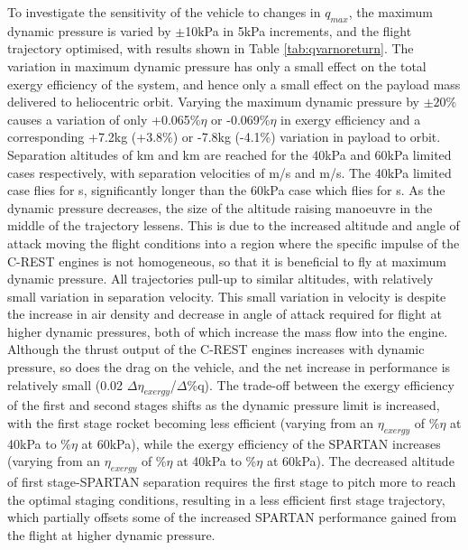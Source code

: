 To investigate the sensitivity of the vehicle to changes in $q_{max}$, the maximum dynamic pressure is varied by $\pm$10kPa in 5kPa increments, and the flight trajectory optimised, with results shown in Table \ref{tab:qvarnoreturn}.
The variation in maximum dynamic pressure has only a small effect on the total exergy efficiency of the system, and hence only a small effect on the payload mass delivered to heliocentric orbit.  Varying the maximum dynamic pressure by $\pm20\%$ causes a variation of only +0.065\%$\eta$ or -0.069\%$\eta$ in exergy efficiency and a corresponding +7.2kg (+3.8\%) or -7.8kg (-4.1\%) variation in payload to orbit.  
Separation altitudes of \secondthirdSeparationAltqFortyNoReturn km and \secondthirdSeparationAltqSixtyNoReturn km are reached for the 40kPa and 60kPa limited cases respectively, with separation velocities of \secondthirdSeparationvqFortyNoReturn m/s and \secondthirdSeparationvqSixtyNoReturn m/s. The 40kPa limited case flies for \secondFlightTimeqFortyNoReturn s, significantly longer than the 60kPa case which flies for \secondFlightTimeqSixtyNoReturn s.
As the dynamic pressure decreases, the size of the altitude raising manoeuvre in the middle of the trajectory lessens. This is due to the increased altitude and angle of attack moving the flight conditions into a region where the specific impulse of the C-REST engines is not homogeneous, so that it is beneficial to fly at maximum dynamic pressure.  
All trajectories pull-up to similar altitudes, with relatively small variation in separation velocity.
This small variation in velocity is despite the increase in air density and decrease in angle of attack required for flight at higher dynamic pressures, both of which increase the mass flow into the engine. Although the thrust output of the C-REST engines increases with dynamic pressure, so does the drag on the vehicle, and the net increase in performance is relatively small (0.02 $\Delta\eta_{exergy}$/$\Delta$\%q). 
The trade-off between the exergy efficiency of the first and second stages shifts as the dynamic pressure limit is increased, with the first stage rocket becoming less efficient (varying from an $\eta_{exergy}$ of \firstExergyEffqFortyNoReturn \%$\eta$ at 40kPa to \firstExergyEffqSixtyNoReturn \%$\eta$ at 60kPa), while the exergy efficiency of the SPARTAN increases (varying from an $\eta_{exergy}$ of \secondExergyEffqFortyNoReturn \%$\eta$ at 40kPa to \secondExergyEffqSixtyNoReturn \%$\eta$ at 60kPa). The decreased altitude of first stage-SPARTAN separation requires the first stage to pitch more to reach the optimal staging conditions, resulting in a less efficient first stage trajectory, which partially offsets some of the increased SPARTAN performance gained from the flight at higher dynamic pressure. 



